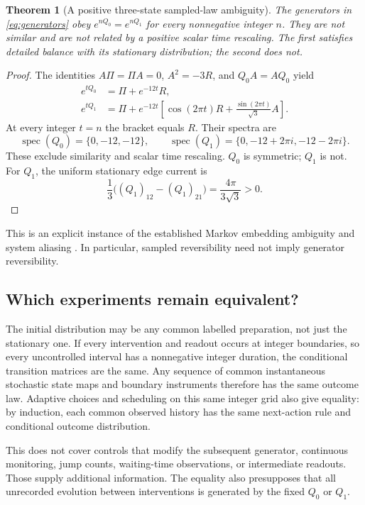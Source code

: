\documentclass[11pt,letterpaper]{article}
\newtheorem{theorem}{Theorem}[section]
\newcommand{\spec}{\operatorname{spec}}
\begin{document}
\begin{theorem}[A positive three-state sampled-law ambiguity]
The generators in \eqref{eq:generators} obey $e^{nQ_0}=e^{nQ_1}$ for every nonnegative integer $n$. They are not similar and are not related by a positive scalar time rescaling. The first satisfies detailed balance with its stationary distribution; the second does not.
\end{theorem}
\begin{proof}
The identities $A\Pi=\Pi A=0$, $A^2=-3R$, and $Q_0A=AQ_0$ yield
\begin{align}
 e^{tQ_0}&=\Pi+e^{-12t}R,\\
 e^{tQ_1}&=\Pi+e^{-12t}\left[\cos(2\pi t)R+
 \frac{\sin(2\pi t)}{\sqrt3}A\right]. \label{eq:semigroup}
\end{align}
At every integer $t=n$ the bracket equals $R$. Their spectra are
\[
 \spec(Q_0)=\{0,-12,-12\},\qquad
 \spec(Q_1)=\{0,-12+2\pi i,-12-2\pi i\}.
\]
These exclude similarity and scalar time rescaling. $Q_0$ is symmetric; $Q_1$ is not. For $Q_1$, the uniform stationary edge current is
\[
 \frac13\bigl((Q_1)_{12}-(Q_1)_{21}\bigr)=\frac{4\pi}{3\sqrt3}>0.
\]
\end{proof}

This is an explicit instance of the established Markov embedding ambiguity and system aliasing \cite{baake,yue}. In particular, sampled reversibility need not imply generator reversibility.

\subsection{Which experiments remain equivalent?}

The initial distribution may be any common labelled preparation, not just the stationary one. If every intervention and readout occurs at integer boundaries, so every uncontrolled interval has a nonnegative integer duration, the conditional transition matrices are the same. Any sequence of common instantaneous stochastic state maps and boundary instruments therefore has the same outcome law. Adaptive choices and scheduling on this same integer grid also give equality: by induction, each common observed history has the same next-action rule and conditional outcome distribution.

This does not cover controls that modify the subsequent generator, continuous monitoring, jump counts, waiting-time observations, or intermediate readouts. Those supply additional information. The equality also presupposes that all unrecorded evolution between interventions is generated by the fixed $Q_0$ or $Q_1$.
\end{document}
